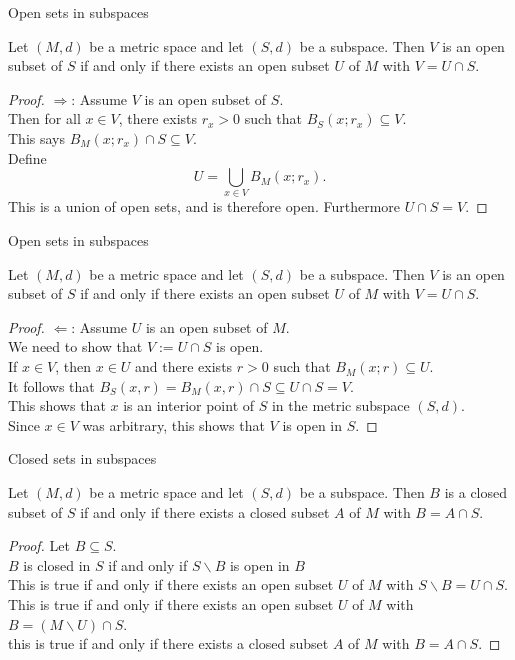 \documentclass{beamer}
\begin{document}
\begin{frame}{Open sets in subspaces}
\begin{thm}
Let $(M,d)$ be a metric space and let $(S,d)$ be a subspace.
Then $V$ is an open subset of $S$ if and only if there exists an open subset $U$ of $M$ with $V = U\cap S$.
\end{thm}
\pause
\begin{proof}
\pause
$\Longrightarrow$: Assume $V$ is an open subset of $S$.\\
\pause
Then for all $x\in V$, there exists $r_x>0$ such that $B_S(x;r_x) \subseteq V$.\\
\pause
This says $B_M(x; r_x)\cap S\subseteq V$.\\
\pause
Define
$$U = \bigcup_{x\in V} B_M(x;r_x).$$
\pause
This is a union of open sets, and is therefore open.
\pause
Furthermore $U\cap S = V$.
\end{proof}
\end{frame}

\begin{frame}{Open sets in subspaces}
\begin{thm}
Let $(M,d)$ be a metric space and let $(S,d)$ be a subspace.
Then $V$ is an open subset of $S$ if and only if there exists an open subset $U$ of $M$ with $V = U\cap S$.
\end{thm}
\pause
\begin{proof}
\pause
$\Longleftarrow$: Assume $U$ is an open subset of $M$.\\
\pause
We need to show that $V:= U\cap S$ is open.\\
\pause
If $x\in V$, then $x\in U$ and there exists $r>0$ such that $B_M(x;r)\subseteq U$.\\
\pause
It follows that $B_S(x,r) = B_M(x,r)\cap S\subseteq U\cap S = V$.\\
\pause
This shows that $x$ is an interior point of $S$ in the metric subspace $(S,d)$.\\
\pause
Since $x\in V$ was arbitrary, this shows that $V$ is open in $S$.
\end{proof}
\end{frame}

\begin{frame}{Closed sets in subspaces}
\begin{thm}
Let $(M,d)$ be a metric space and let $(S,d)$ be a subspace.
Then $B$ is a closed subset of $S$ if and only if there exists a closed subset $A$ of $M$ with $B = A\cap S$.
\end{thm}
\pause
\begin{proof}
\pause
Let $B\subseteq S$.\\
\pause
$B$ is closed in $S$ if and only if $S\backslash B$ is open in $B$\\
\pause
This is true if and only if there exists an open subset $U$ of $M$ with $S\backslash B = U\cap S$.\\
\pause
This is true if and only if there exists an open subset $U$ of $M$ with $B = (M\backslash U)\cap S$.\\
\pause
this is true if and only if there exists a closed subset $A$ of $M$ with $B = A\cap S$.
\end{proof}
\end{frame}
\end{document}
